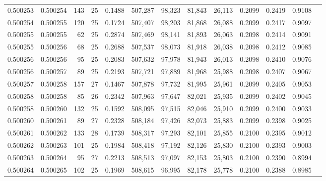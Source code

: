 \begin{tabular}{rrrrrrrrrrrrr}
0.500253 & 0.500254 & 143 &  25 &                                     0.1488 & 507,287 &  98,323 &  81,843 &  26,113 & 0.2099 & 0.2419 & 0.9108 \\
0.500254 & 0.500255 & 120 &  25 &                                     0.1724 & 507,407 &  98,203 &  81,868 &  26,088 & 0.2099 & 0.2417 & 0.9097 \\
0.500255 & 0.500255 &  62 &  25 &                                     0.2874 & 507,469 &  98,141 &  81,893 &  26,063 & 0.2098 & 0.2414 & 0.9091 \\
0.500255 & 0.500256 &  68 &  25 &                                     0.2688 & 507,537 &  98,073 &  81,918 &  26,038 & 0.2098 & 0.2412 & 0.9085 \\
0.500256 & 0.500256 &  95 &  25 &                                     0.2083 & 507,632 &  97,978 &  81,943 &  26,013 & 0.2098 & 0.2410 & 0.9076 \\
0.500256 & 0.500257 &  89 &  25 &                                     0.2193 & 507,721 &  97,889 &  81,968 &  25,988 & 0.2098 & 0.2407 & 0.9067 \\
0.500257 & 0.500258 & 157 &  27 &                                     0.1467 & 507,878 &  97,732 &  81,995 &  25,961 & 0.2099 & 0.2405 & 0.9053 \\
0.500258 & 0.500258 &  85 &  26 &                                     0.2342 & 507,963 &  97,647 &  82,021 &  25,935 & 0.2099 & 0.2402 & 0.9045 \\
0.500258 & 0.500260 & 132 &  25 &                                     0.1592 & 508,095 &  97,515 &  82,046 &  25,910 & 0.2099 & 0.2400 & 0.9033 \\
0.500260 & 0.500261 &  89 &  27 &                                     0.2328 & 508,184 &  97,426 &  82,073 &  25,883 & 0.2099 & 0.2398 & 0.9025 \\
0.500261 & 0.500262 & 133 &  28 &                                     0.1739 & 508,317 &  97,293 &  82,101 &  25,855 & 0.2100 & 0.2395 & 0.9012 \\
0.500262 & 0.500263 & 101 &  25 &                                     0.1984 & 508,418 &  97,192 &  82,126 &  25,830 & 0.2100 & 0.2393 & 0.9003 \\
0.500263 & 0.500264 &  95 &  27 &                                     0.2213 & 508,513 &  97,097 &  82,153 &  25,803 & 0.2100 & 0.2390 & 0.8994 \\
0.500264 & 0.500265 & 102 &  25 &                                     0.1969 & 508,615 &  96,995 &  82,178 &  25,778 & 0.2100 & 0.2388 & 0.8985 \\

\end{tabular}
